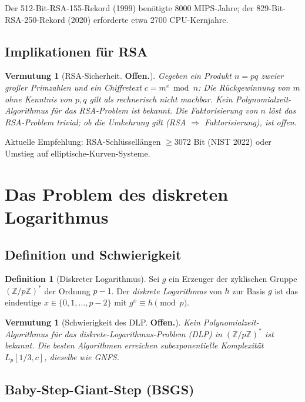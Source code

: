 \documentclass[12pt,a4paper]{amsart}
\newtheorem{vermutung}[theorem]{Vermutung}
\theoremstyle{definition}
\newtheorem{definition}[theorem]{Definition}
\begin{document}
Der 512-Bit-RSA-155-Rekord (1999) benötigte 8000 MIPS-Jahre; der 829-Bit-RSA-250-Rekord
(2020) erforderte etwa 2700 CPU-Kernjahre.

\subsection{Implikationen für RSA}

\begin{vermutung}[RSA-Sicherheit. \textbf{Offen.}]
Gegeben ein Produkt $n = pq$ zweier großer Primzahlen und ein Chiffretext
$c = m^e \bmod n$: Die Rückgewinnung von $m$ ohne Kenntnis von $p,q$ gilt als
rechnerisch nicht machbar. Kein Polynomialzeit-Algorithmus für das RSA-Problem
ist bekannt. Die Faktorisierung von $n$ löst das RSA-Problem trivial;
ob die Umkehrung gilt (RSA $\Rightarrow$ Faktorisierung), ist offen.
\end{vermutung}

Aktuelle Empfehlung: RSA-Schlüssellängen $\ge 3072$ Bit (NIST 2022) oder
Umstieg auf elliptische-Kurven-Systeme.

\section{Das Problem des diskreten Logarithmus}

\subsection{Definition und Schwierigkeit}

\begin{definition}[Diskreter Logarithmus]
Sei $g$ ein Erzeuger der zyklischen Gruppe $(\mathbb{Z}/p\mathbb{Z})^*$ der
Ordnung $p-1$. Der \emph{diskrete Logarithmus} von $h$ zur Basis $g$ ist das
eindeutige $x \in \{0,1,\ldots,p-2\}$ mit $g^x \equiv h \pmod{p}$.
\end{definition}

\begin{vermutung}[Schwierigkeit des DLP. \textbf{Offen.}]
Kein Polynomialzeit-Algorithmus für das diskrete-Logarithmus-Problem (DLP) in
$(\mathbb{Z}/p\mathbb{Z})^*$ ist bekannt. Die besten Algorithmen erreichen
subexponentielle Komplexität $L_p[1/3, c]$, dieselbe wie GNFS.
\end{vermutung}

\subsection{Baby-Step-Giant-Step (BSGS)}
\end{document}
